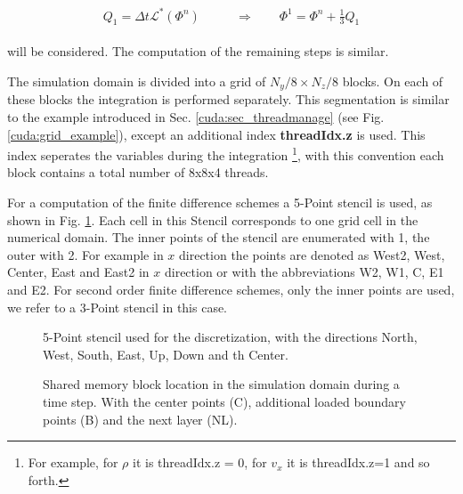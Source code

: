 \begin{align}
    \begin{split}
    Q_1 = \Delta t \mathcal{L}^*\left(\Phi^n\right)\qquad &\Rightarrow \qquad \Phi^{1} = \Phi^n + \frac{1}{3}Q_1
    \end{split}
\end{align}

will be considered.  The computation of the remaining steps is similar.


The simulation domain is divided into a grid of  $N_y/8 \times N_z/8$ blocks. On each of these blocks the integration is performed separately.
This segmentation is similar to the example introduced in Sec. \ref{cuda:sec_threadmanage} (see Fig. \ref{cuda:grid_example}), except an
additional index \textbf{threadIdx.z} is used.
This index seperates the variables during the integration
\footnote{For example, for $\rho$ it is threadIdx.z = 0, for $v_x$  it is threadIdx.z=1 and so forth.},
with this convention each block contains a total number of 8x8x4 threads.

For a computation of the finite difference schemes  a 5-Point stencil is used, as shown in Fig. \ref{cuda:stencil}.
Each cell in this Stencil corresponds to one grid cell in the numerical domain.
The inner points of the stencil are enumerated with 1, the outer with 2. For example in $x$ direction the points are denoted as West2,
West, Center, East and East2 in $x$ direction or with the abbreviations W2, W1, C, E1 and E2.
For second order finite difference schemes, only the inner points  are used, we refer to a 3-Point stencil in this case.

\begin{figure}[!bp]
      \centering
        \caption{
            5-Point stencil used for the discretization, with the directions North, West, South, East, Up, Down and th Center.
        }
       \label{cuda:stencil}
\end{figure}

\begin{figure}[!bp]
      \centering
       \caption{
           Shared memory block location in the simulation domain during a time step. With the center points (C), additional loaded boundary  points (B)
           and the next layer (NL).
       }
       \label{cuda:timestep_algo_img}
\end{figure}
\clearpage

